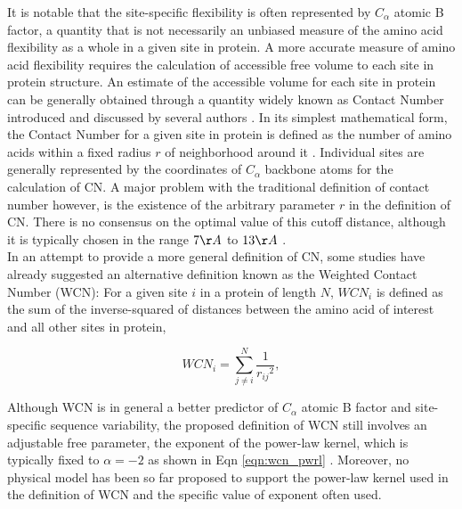 \documentclass[11pt]{article}
\begin{document}
    It is notable that the site-specific flexibility is often represented by $C_\alpha$ atomic B factor, a quantity that is not necessarily an unbiased measure of the amino acid flexibility as a whole in a given site in protein. A more accurate measure of amino acid flexibility requires the calculation of accessible free volume to each site in protein structure. An estimate of the accessible volume for each site in protein can be generally obtained through a quantity widely known as Contact Number introduced and discussed by several authors \citep[e.g.,][]{liao_protein_2005}. In its simplest mathematical form, the Contact Number for a given site in protein is defined as the number of amino acids within a fixed radius $r$ of neighborhood around it \citep[e.g.,][]{franzosa_structural_2009}. Individual sites are generally represented by the coordinates of $C_\alpha$ backbone atoms for the calculation of CN. A major problem with the traditional definition of contact number however, is the existence of the arbitrary parameter $r$ in the definition of CN. There is no consensus on the optimal value of this cutoff distance, although it is typically chosen in the range $7\AA$ to $13\AA$ \citep[e.g.,][]{lin_deriving_2008, franzosa_structural_2009}. \\

	In an attempt to provide a more general definition of CN, some studies \citep[e.g.,][]{lin_deriving_2008} have already suggested an alternative definition known as the Weighted Contact Number (WCN): For a given site $i$ in a protein of length $N$, $WCN_i$ is defined as the sum of the inverse-squared of distances between the amino acid of interest and all other sites in protein,

        \begin{equation}
            \label{eqn:wcn_pwrl}
            WCN_{i} = \sum^N_{j\neq i} \frac{1}{{r_{ij}}^{2}},
        \end{equation}

	Although WCN is in general a better predictor of $C_\alpha$ atomic B factor and site-specific sequence variability, the proposed definition of WCN still involves an adjustable free parameter, the exponent of the power-law kernel, which is typically fixed to $\alpha=-2$ as shown in Eqn \ref{eqn:wcn_pwrl} \citep[e.g.,][]{yang_protein_2009}. Moreover, no physical model has been so far proposed to support the power-law kernel used in the definition of WCN and the specific value of exponent often used. \\
\end{document}
